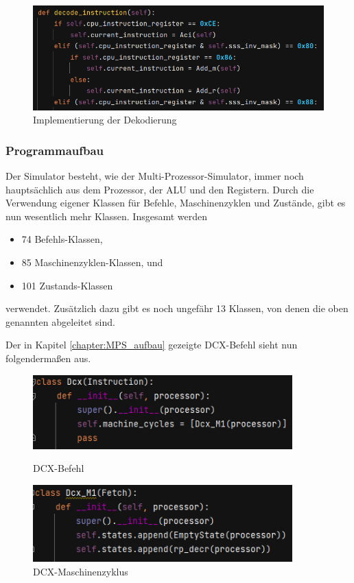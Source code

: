 \documentclass[12pt]{article}
\newcommand{\imgSpaceBefore}{\vspace{10pt}}
\begin{document}
\imgSpaceBefore
\begin{figure}[H]
\centering
\includegraphics[width=15cm]{bilder/DecodeInstruction}
\caption{Implementierung der Dekodierung}
\label{fig:Decode_instr}
\end{figure}

\subsubsection{Programmaufbau}

Der Simulator besteht, wie der Multi-Prozessor-Simulator, immer noch hauptsächlich aus dem Prozessor, der ALU und den Registern. Durch die Verwendung eigener Klassen für Befehle, Maschinenzyklen und Zustände, gibt es nun wesentlich mehr Klassen. Insgesamt werden

\begin{itemize}
\item 74 Befehls-Klassen,
\item 85 Maschinenzyklen-Klassen, und
\item 101 Zustands-Klassen
\end{itemize}

\noindent
verwendet. Zusätzlich dazu gibt es noch ungefähr 13 Klassen, von denen die oben genannten abgeleitet sind.

\noindent
Der in Kapitel \ref{chapter:MPS_aufbau} gezeigte DCX-Befehl sieht nun folgendermaßen aus.

\imgSpaceBefore
\begin{figure}[H]
\centering
\includegraphics[width=10cm]{bilder/dcx_inst}
\caption{DCX-Befehl}
\vspace{15pt}
\includegraphics[width=10cm]{bilder/dcx_mc}
\caption{DCX-Maschinenzyklus}
\label{fig:Dcx_instr}
\end{figure}
\end{document}

